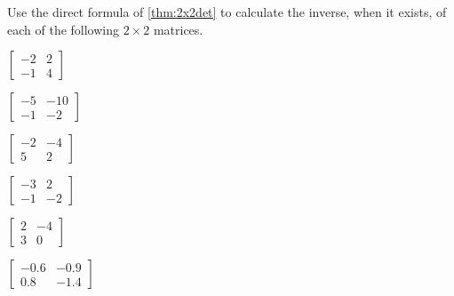 \begin{exercise} \label{ex:2x2det} 
Use the direct formula of \cref{thm:2x2det} to calculate the inverse, when it exists, of each of the following \(2\times2\) matrices.
\begin{Parts}
\item \(\begin{bmatrix} -2&2
\\-1&4 \end{bmatrix}\)

\item \(\begin{bmatrix} -5&-10
\\-1&-2 \end{bmatrix}\)

\item \(\begin{bmatrix} -2&-4
\\5&2 \end{bmatrix}\)

\item \(\begin{bmatrix} -3&2
\\-1&-2 \end{bmatrix}\)

\begin{OmitV1}
\item \(\begin{bmatrix} 2&-4
\\3&0 \end{bmatrix}\)

\item \(\begin{bmatrix} -0.6&-0.9
\\0.8&-1.4 \end{bmatrix}\)


\end{OmitV1}
\end{Parts}
\end{exercise}
